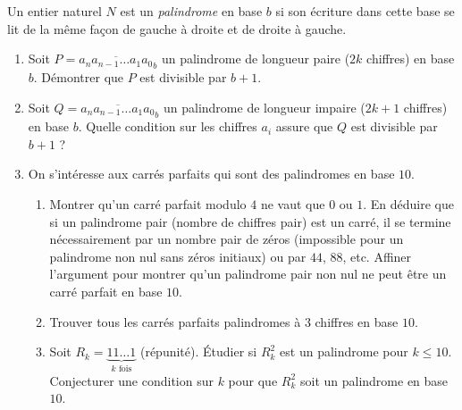 \documentclass[11pt]{article}
\begin{document}
\begin{exercice}
Un entier naturel $N$ est un \textit{palindrome} en base $b$ si son écriture dans cette base se lit de la même façon de gauche à droite et de droite à gauche.
\begin{enumerate}
    \item Soit $P = \overline{a_n a_{n-1} \dots a_1 a_0}_b$ un palindrome de longueur paire ($2k$ chiffres) en base $b$. Démontrer que $P$ est divisible par $b+1$.
    \item Soit $Q = \overline{a_n a_{n-1} \dots a_1 a_0}_b$ un palindrome de longueur impaire ($2k+1$ chiffres) en base $b$. Quelle condition sur les chiffres $a_i$ assure que $Q$ est divisible par $b+1$ ?
    \item On s'intéresse aux carrés parfaits qui sont des palindromes en base $10$.
    \begin{enumerate}
        \item Montrer qu'un carré parfait modulo $4$ ne vaut que $0$ ou $1$. En déduire que si un palindrome pair (nombre de chiffres pair) est un carré, il se termine nécessairement par un nombre pair de zéros (impossible pour un palindrome non nul sans zéros initiaux) ou par $44$, $88$, etc. Affiner l'argument pour montrer qu'un palindrome pair non nul ne peut être un carré parfait en base $10$.
        \item Trouver tous les carrés parfaits palindromes à $3$ chiffres en base $10$.
        \item Soit $R_k = \underbrace{11\dots 1}_{k \text{ fois}}$ (répunité). Étudier si $R_k^2$ est un palindrome pour $k \leq 10$. Conjecturer une condition sur $k$ pour que $R_k^2$ soit un palindrome en base $10$.
    \end{enumerate}
\end{enumerate}
\end{exercice}
\end{document}
